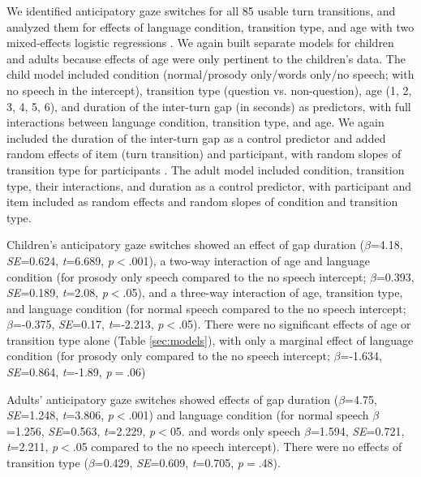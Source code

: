 \documentclass[authoryear, 12pt]{elsarticle}
\begin{document}
We identified anticipatory gaze switches for all 85 usable turn transitions, and analyzed them for effects of language condition, transition type, and age with two mixed-effects logistic regressions \citep{lme4, R}. We again built separate models for children and adults because effects of age were only pertinent to the children's data. The child model included condition (normal/prosody only/words only/no speech; with no speech in the intercept), transition type (question vs. non-question), age (1, 2, 3, 4, 5, 6), and duration of the inter-turn gap (in seconds) as predictors, with full interactions between language condition, transition type, and age.  We again included the duration of the inter-turn gap as a control predictor and added random effects of item (turn transition) and participant, with random slopes of transition type for participants \citep{barr2013}. The adult model included condition, transition type, their interactions, and duration as a control predictor, with participant and item included as random effects and random slopes of condition and transition type.

Children's anticipatory gaze switches showed an effect of gap duration (\textit{$\beta$}=4.18, \textit{SE}=0.624, \textit{t}=6.689, \textit{p}$<$.001), a two-way interaction of age and language condition (for prosody only speech compared to the no speech intercept; \textit{$\beta$}=0.393, \textit{SE}=0.189, \textit{t}=2.08, \textit{p}$<$.05), and a three-way interaction of age, transition type, and language condition (for normal speech compared to the no speech intercept; \textit{$\beta$}=-0.375, \textit{SE}=0.17, \textit{t}=-2.213, \textit{p}$<$.05). There were no significant effects of age or transition type alone (Table \ref{sec:models}), with only a marginal effect of language condition (for prosody only compared to the no speech intercept; \textit{$\beta$}=-1.634, \textit{SE}=0.864, \textit{t}=-1.89, \textit{p}$=$.06)

Adults' anticipatory gaze switches showed effects of gap duration (\textit{$\beta$}=4.75, \textit{SE}=1.248, \textit{t}=3.806, \textit{p}$<$.001) and language condition (for normal speech \textit{$\beta$}=1.256, \textit{SE}=0.563, \textit{t}=2.229, \textit{p}$<$05. and words only speech \textit{$\beta$}=1.594, \textit{SE}=0.721, \textit{t}=2.211, \textit{p}$<$.05  compared to the no speech intercept). There were no effects of transition type (\textit{$\beta$}=0.429, \textit{SE}=0.609, \textit{t}=0.705, \textit{p}$=$.48).
\end{document}

